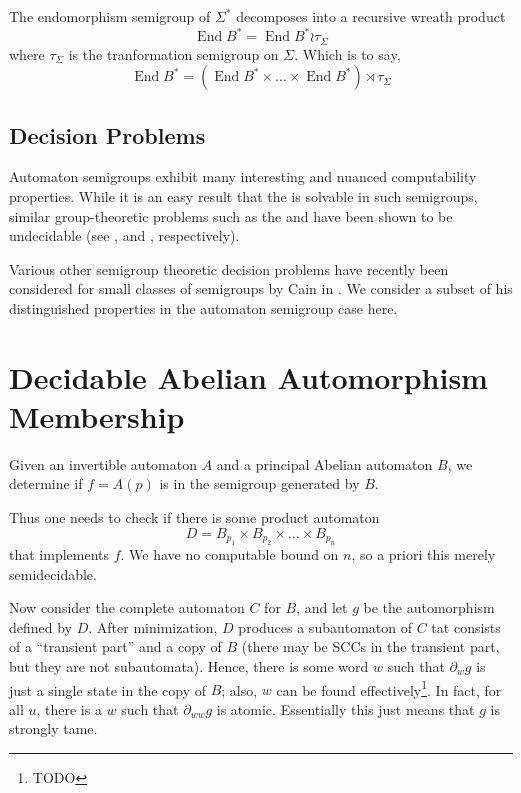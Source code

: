 \documentclass[11pt]{article}
\begin{document}
The endomorphism semigroup of $\Sigma^*$ decomposes into a recursive
wreath product
\[
  \operatorname{End}B^* = \operatorname{End}B^* \wr \tau_\Sigma
\]
where $\tau_\Sigma$ is the tranformation semigroup on $\Sigma$. Which
is to say,
\[
  \operatorname{End}B^* = (\operatorname{End}B^* \times \ldots \times
  \operatorname{End}B^* ) \rtimes \tau_\Sigma
\]



\subsection*{Decision Problems}
Automaton semigroups exhibit many interesting and nuanced
computability properties. While it is an easy result that the
 is solvable in such semigroups, similar
group-theoretic problems such as the  and
 have been shown to be undecidable
(see \cite{sunic:conj}, and \cite{gillibert:finite}, respectively).

Various other semigroup theoretic decision problems have recently been
considered for small classes of semigroups by Cain in
\cite{Cain09:dec_prob}. We consider a subset of his distinguished
properties in the automaton semigroup case here.


\section{Decidable Abelian Automorphism Membership}


Given an invertible automaton $A$ and a principal Abelian automaton
$B$, we determine if $f = A(p)$ is in the semigroup generated by $B$.

Thus one needs to check if there is some product automaton
\[
  D = B_{p_1} \times B_{p_2} \times \ldots \times B_{p_n}
\]
that implements $f$. We have no computable bound on $n$, so a priori
this merely semidecidable.

Now consider the complete automaton $C$ for $B$, and let $g$ be the
automorphism defined by $D$. After minimization, $D$ produces a
subautomaton of $C$ tat consists of a ``transient part'' and a copy of
$B$ (there may be SCCs in the transient part, but they are not
subautomata). Hence, there is some word $w$ such that $\partial_w g$
is just a single state in the copy of $B$; also, $w$ can be found
effectively\footnote{TODO}. In fact, for all $u$, there is a $w$ such
that $\partial_{ww}g$ is atomic. Essentially this just means that $g$
is strongly tame.
\end{document}
